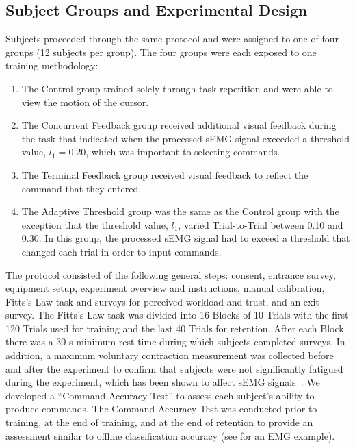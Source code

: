 \subsection{Subject Groups and Experimental Design}
Subjects proceeded through the same protocol and were assigned to one of four groups (12 subjects per group).
The four groups were each exposed to one training methodology:

\begin{enumerate}
	\item The Control group trained solely through task repetition and were able to view the motion of the cursor.
	\item The Concurrent Feedback group received additional visual feedback during the task that indicated when the processed sEMG signal exceeded a threshold value, $l_1=0.20$, which was important to selecting commands.
	\item The Terminal Feedback group received visual feedback to reflect the command that they entered.
	\item The Adaptive Threshold group was the same as the Control group with the exception that the threshold value, $l_1$, varied Trial-to-Trial between 0.10 and 0.30.
	      In this group, the processed sEMG signal had to exceed a threshold that changed each trial in order to input commands.
\end{enumerate}

The protocol consisted of the following general steps: consent, entrance survey, equipment setup, experiment overview and instructions, manual calibration, Fitts's Law task and surveys for perceived workload and trust, and an exit survey.
The Fitts's Law task was divided into 16 Blocks of 10 Trials with the first 120 Trials used for training and the last 40 Trials for retention.
After each Block there was a 30 s minimum rest time during which subjects completed surveys.
In addition, a maximum voluntary contraction measurement was collected before and after the experiment to confirm that subjects were not significantly fatigued during the experiment, which has been shown to affect sEMG signals~\citep{RN47}.
We developed a ``Command Accuracy Test'' to assess each subject's ability to produce commands.
The Command Accuracy Test was conducted prior to training, at the end of training, and at the end of retention to provide an assessment similar to offline classification accuracy (see \citet{RN48} for an EMG example).

